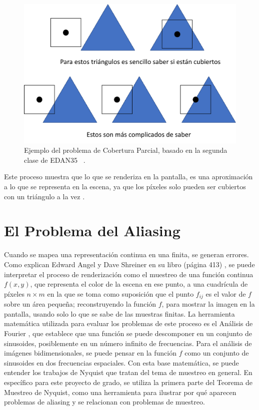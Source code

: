 \documentclass[pregrado]{tesis-usb} %
\begin{document}
\begin{figure}[!hbt]
	\centering
	\includegraphics[scale=0.5]{images/edge_testing.png} 
	\caption{Ejemplo del problema de Cobertura Parcial, basado en la segunda clase de EDAN35 ~\cite{Doggett2017EDAN35}. }\label{fig:partialcover}
\end{figure}

Este proceso muestra que lo que se renderiza en la pantalla, es una aproximación a lo que se representa en la escena, ya que los píxeles solo pueden ser cubiertos con un triángulo a la vez \cite{Moller2007, Doggett2017EDAN35}.


\section{El Problema del Aliasing}
Cuando se mapea una representación continua en una finita, se generan errores. Como explican Edward Angel y Dave Shreiner en su libro (página 413) \cite{Shreiner2011}, se puede interpretar el proceso de renderización como el muestreo de una función continua $f(x, y)$, que representa el color de la escena en ese punto, a una cuadrícula de píxeles $n\times m$ en la que se toma como suposición que el punto $f_{ij}$ es el valor de $f$ sobre un área pequeña; reconstruyendo la función $f$, para mostrar la imagen en la pantalla, usando solo lo que se sabe de las muestras finitas. La herramienta matemática utilizada para evaluar los problemas de este proceso es el Análisis de Fourier \cite{Shreiner2011}, que establece que una función se puede descomponer en un conjunto de sinusoides, posiblemente en un número infinito de frecuencias. Para el análisis de imágenes bidimensionales, se puede pensar en la función $f$ como un conjunto de sinusoides en dos frecuencias espaciales. Con esta base matemática, se puede entender los trabajos de Nyquist que tratan del tema de muestreo en general. En específico para este proyecto de grado, se utiliza la primera parte del Teorema de Muestreo de Nyquist, como una herramienta para ilustrar por qué aparecen problemas de aliasing y se relacionan con problemas de muestreo.  \\
\end{document}
